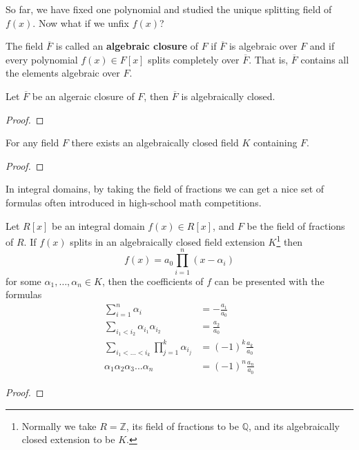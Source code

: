   So far, we have fixed one polynomial and studied the unique splitting field of $f(x)$. Now what if we unfix $f(x)$? 

  \begin{definition}
    The field $\overline{F}$ is called an \textbf{algebraic closure} of $F$ if $\overline{F}$ is algebraic over $F$ and if every polynomial $f(x) \in F[x]$ splits completely over $\overline{F}$. That is, $\overline{F}$ contains all the elements algebraic over $F$. 
  \end{definition}

  \begin{lemma}
    Let $\overline{F}$ be an algeraic closure of $F$, then $\overline{F}$ is algebraically closed. 
  \end{lemma}
  \begin{proof}
    
  \end{proof}

  \begin{theorem}
    For any field $F$ there exists an algebraically closed field $K$ containing $F$.
  \end{theorem}
  \begin{proof}
    
  \end{proof}

  In integral domains, by taking the field of fractions we can get a nice set of formulas often introduced in high-school math competitions. 

  \begin{theorem}
    Let $R[x]$ be an integral domain $f(x) \in R[x]$, and $F$ be the field of fractions of $R$. If $f(x)$ splits in an algebraically closed field extension $K$\footnote{Normally we take $R = \mathbb{Z}$, its field of fractions to be $\mathbb{Q}$, and its algebraically closed extension to be $K$.} then
    \begin{equation}
      f(x) = a_0 \prod_{i = 1}^{n} (x - \alpha_i)
    \end{equation}
    for some $\alpha_1, \ldots, \alpha_n \in K$, then the coefficients of $f$ can be presented with the formulas
    \begin{align}
      \sum_{i=1}^n \alpha_i & = - \frac{a_1}{a_0} \\
      \sum_{i_1 < i_2} \alpha_{i_1} \alpha_{i_2} & = \frac{a_2}{a_0} \\
      \sum_{i_1< ...< i_k} \prod_{j = 1}^{k} \alpha_{i_j} & = (-1)^k \frac{a_k}{a_0} \\
      \alpha_1 \alpha_2 \alpha_3 ... \alpha_n & = (-1)^n \frac{a_n}{a_0}
    \end{align}
  \end{theorem}
  \begin{proof}
    
  \end{proof}

